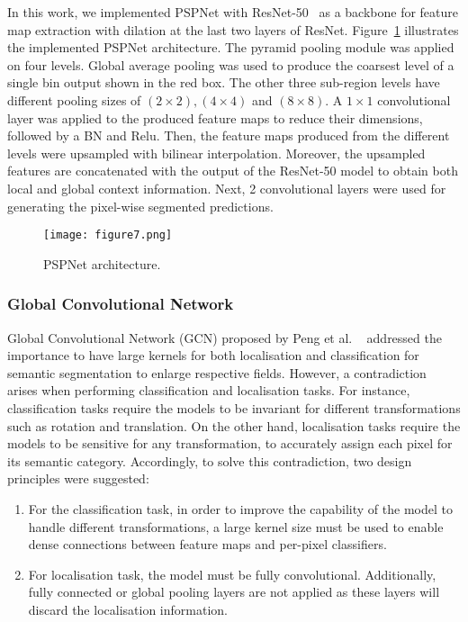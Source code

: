 In this work, we implemented PSPNet with ResNet-50~\cite{He2016} as a backbone for feature map extraction with dilation at the last two layers of ResNet. 
Figure~\ref{fig:PSPNet} illustrates the implemented PSPNet architecture.
The pyramid pooling module was applied on four levels.
Global average pooling was used to produce the coarsest level of a single bin output shown in the red box. 
The other three sub-region levels have different pooling sizes of \((2\times 2), (4\times 4)\) and \((8\times8)\).
A \(1 \times 1\) convolutional layer was applied to the produced feature maps to reduce their dimensions, followed by a BN and Relu.
Then, the feature maps produced from the different levels were upsampled with bilinear interpolation.
Moreover, the upsampled features are concatenated with the output of the ResNet-50 model to obtain both local and global context information. 
Next, 2 convolutional layers were used for generating the pixel-wise segmented predictions. 
\begin{figure} [h!]
	\centering
	\texttt{[image: figure7.png]}
	\caption{PSPNet architecture.} 
	\label{fig:PSPNet}
\end{figure} 

\subsubsection{Global Convolutional Network}
Global Convolutional Network (GCN) proposed by Peng et al. 
~\cite{Peng2017} addressed the importance to have large kernels for both 
localisation and classification for semantic segmentation to enlarge 
respective fields.
However, a contradiction arises when performing classification and localisation 
tasks. 
For instance, classification tasks require the models to be invariant for 
different transformations such as rotation and translation.
On the other hand, localisation tasks require the models to be sensitive for 
any transformation, to accurately assign each pixel for its semantic category.
Accordingly, to solve this contradiction, two design principles were suggested: 
\begin{enumerate}
	\item For the classification task, in order to improve the capability of 
	the model to handle different transformations, a large kernel size must be 
	used to enable dense connections between feature maps and per-pixel 
	classifiers.
	\item For localisation task, the model must be fully convolutional. 
	Additionally, fully connected or global pooling layers are not applied as 
	these layers will discard the localisation information. 
\end{enumerate}

